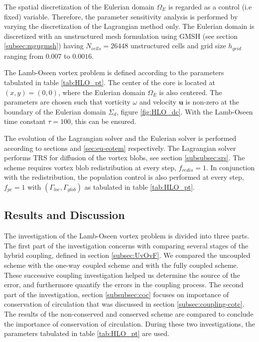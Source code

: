 The spatial discretization of the Eulerian domain $\Omega_E$ is regarded as a control (i.e fixed) variable. Therefore, the parameter sensitivity analysis is performed by varying the discretization of the Lagrangian method only. The Eulerian domain is discretized with an unstructured mesh formulation using GMSH (see section \ref{subsec:mgugmsh}) having $N_{cells} = 26448$ unstructured cells and grid size $h_{grid}$ ranging from $0.007$ to $0.0016$. 

The Lamb-Oseen vortex problem is defined according to the parameters tabulated in table \ref{tab:HLO_pt}. The center of the core is located at $(x,y)=(0,0)$, where the Eulerian domain $\Omega_E$ is also centered. The parameters are chosen such that vorticity $\omega$ and velocity $\mathbf{u}$ is non-zero at the boundary of the Eulerian domain $\Sigma_d$, figure \ref{fig:HLO_dc}. With the Lamb-Oseen time constant $\tau = 100$, this can be ensured.

The evolution of the Lagrangian solver and the Eulerian solver is performed according to sections \label{sec:eu-eotlm} and  \ref{sec:eu-eotem} respectively. The Lagrangian solver performs TRS for diffusion of the vortex blobs, see section \ref{subsubsec:srs}. The scheme requires vortex blob redistribution at every step, $f_{redis} = 1$. In conjunction with the redistribution, the population control is also performed at every step, $f_{pc}=1$ with $(\Gamma_{loc},\Gamma_{glob})$ as tabulated in table \ref{tab:HLO_pt}.

\subsection{Results and Discussion}

The investigation of the Lamb-Oseen vortex problem is divided into three parts. The first part of the investigation concerns with comparing several stages of the hybrid coupling, defined in section \ref{subsec:UvOvF}. We compared the uncoupled scheme with the one-way coupled scheme and with the fully coupled scheme. These successive coupling investigation helped us determine the source of the error, and furthermore quantify the errors in the coupling process. The second part of the investigation, section \ref{subsubsec:coc} focuses on importance of conservation of circulation that was discussed in section \ref{subsec:coupling-cotc}. The results of the non-conserved and conserved scheme are compared to conclude the importance of conservation of circulation. During these two investigations, the parameters tabulated in table \ref{tab:HLO_pt} are used.


